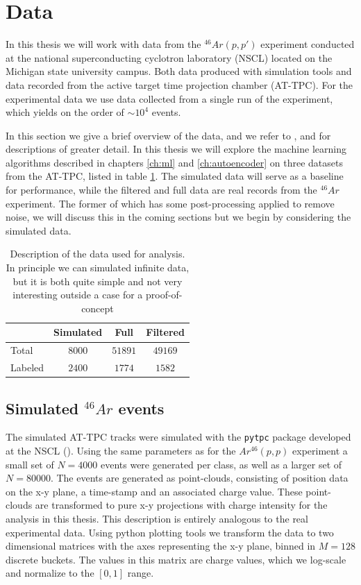 \section{Data}\label{sec:data}

In this thesis we will work with data from the ${}^{46}Ar(p, p')$ experiment conducted at the national superconducting cyclotron laboratory (NSCL) located on the Michigan state university campus. Both data produced with simulation tools and data recorded from the active target time projection chamber (AT-TPC). For the experimental data we use data collected from a single run of the experiment, which yields on the order of $\sim 10^4$ events.	

In this section we give a brief overview of the data, and we refer to \cite{Mittig2015}, \cite{Suzuki2012} and  \cite{Bradt2017a}  for descriptions of greater detail. In this thesis we will explore the machine learning algorithms described in chapters \ref{ch:ml} and \ref{ch:autoencoder} on three datasets from the AT-TPC, listed in table \ref{tab:datasets}. The simulated data will serve as a baseline for performance, while the filtered and full data are real records from the ${}^{46}Ar$ experiment. The former of which has some post-processing applied to remove noise, we will discuss this in the coming sections but we begin by considering the simulated data.

\begin{table}[H]
\centering
\caption{Description of the data used for analysis. In principle we can simulated infinite data, but it is both quite simple and not very interesting outside a case for a proof-of-concept}\label{tab:datasets}
\begin{tabular}{lccc}
\toprule
{} & Simulated & Full & Filtered \\
\midrule
Total &  $8000$ & $51891$ & $49169$ \\
Labeled & $2400$ & $1774$ &  $1582$ \\ 
\bottomrule
\end{tabular}
\end{table}

\subsection{Simulated \texorpdfstring{${}^{46}Ar$}{46Ar}  events}\label{sec:data_sim}

The simulated AT-TPC tracks were simulated with the \lstinline{pytpc} package developed at the NSCL (\cite{Bradt2017a}). Using the same parameters as for the $Ar^{46}(p, p)$ experiment a small set of $N=4000$ events were generated per class, as well as a larger set of $N=80000$. The events are generated as point-clouds, consisting of position data on the x-y plane, a time-stamp and an associated charge value. These point-clouds are transformed to pure x-y projections with charge intensity for the analysis in this thesis. This description is entirely analogous to the real experimental data. Using python plotting tools we transform the data to two dimensional matrices with the axes representing the x-y plane, binned in $M=128$ discrete buckets. The values in this matrix are charge values, which we log-scale and normalize to the $[0, 1]$ range. 

